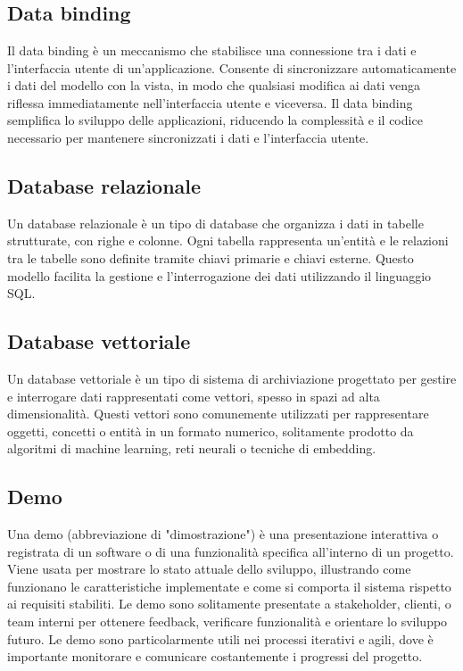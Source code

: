 
\section{}

\hypertarget{sec:data_binding}{}
\subsection*{Data binding}
Il data binding è un meccanismo che stabilisce una connessione tra i dati e l'interfaccia utente di un'applicazione. Consente di sincronizzare automaticamente
i dati del modello con la vista, in modo che qualsiasi modifica ai dati venga riflessa immediatamente nell'interfaccia utente e viceversa. Il data binding
semplifica lo sviluppo delle applicazioni, riducendo la complessità e il codice necessario per mantenere sincronizzati i dati e l'interfaccia utente.

\hypertarget{sec:database_relazionale}{}
\subsection*{Database relazionale}
Un database relazionale è un tipo di database che organizza i dati in tabelle strutturate, con righe e colonne. Ogni tabella rappresenta un'entità e le 
relazioni tra le tabelle sono definite tramite chiavi primarie e chiavi esterne. Questo modello facilita la gestione e l'interrogazione dei dati utilizzando 
il linguaggio SQL.

\hypertarget{sec:database_vettoriale}{}
\subsection*{Database vettoriale}
Un database vettoriale è un tipo di sistema di archiviazione progettato per gestire e interrogare dati rappresentati come vettori, spesso in spazi ad 
alta dimensionalità. Questi vettori sono comunemente utilizzati per rappresentare oggetti, concetti o entità in un formato numerico, solitamente prodotto 
da algoritmi di machine learning, reti neurali o tecniche di embedding.

\hypertarget{sec:demo}{}
\subsection*{Demo}
Una demo (abbreviazione di "dimostrazione") è una presentazione interattiva o registrata di un software o di una funzionalità specifica all'interno di un 
progetto. Viene usata per mostrare lo stato attuale dello sviluppo, illustrando come funzionano le caratteristiche implementate e come si comporta il 
sistema rispetto ai requisiti stabiliti. Le demo sono solitamente presentate a stakeholder, clienti, o team interni per ottenere feedback, verificare 
funzionalità e orientare lo sviluppo futuro. Le demo sono particolarmente utili nei processi iterativi e agili, dove è importante monitorare e comunicare 
costantemente i progressi del progetto.

